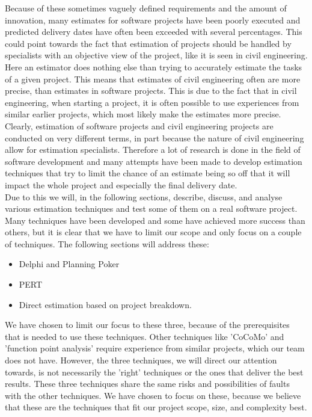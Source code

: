 Because of these sometimes vaguely defined requirements and the amount of innovation, many estimates for software projects have been poorly executed and predicted delivery dates have often been exceeded with several percentages. This could point towards the fact that estimation of projects should be handled by specialists with an objective view of the project, like it is seen in civil engineering. Here an estimator does nothing else than trying to accurately estimate the tasks of a given project\cite[p.140]{ProjectManagement_b}. This means that estimates of civil engineering often are more precise, than estimates in software projects. This is due to the fact that in civil engineering, when starting a project, it is often possible to use experiences from similar earlier projects, which most likely make the estimates more precise. \\
Clearly, estimation of software projects and civil engineering projects are conducted on very different terms, in part because the nature of civil engineering allow for estimation specialists. Therefore a lot of research is done in the field of software development and many attempts have been made to develop estimation techniques that try to limit the chance of an estimate being so off that it will impact the whole project and especially the final delivery date. \\
Due to this we will, in the following sections, describe, discuss, and analyse various estimation techniques and test some of them on a real software project. Many techniques have been developed and some have achieved more success than others, but it is clear that we have to limit our scope and only focus on a couple of techniques. The following sections will address these:

\begin{itemize}
\item Delphi and Planning Poker  
\item PERT 
\item Direct estimation based on project breakdown.
\end{itemize}


We have chosen to limit our focus to these three, because of the prerequisites that is needed to use these techniques. Other techniques like 'CoCoMo' and 'function point analysis' require experience from similar projects, which our team does not have. However, the three techniques, we will direct our attention towards, is not necessarily the 'right' techniques or the ones that deliver the best results. These three techniques share the same risks and possibilities of faults with the other techniques. We have chosen to focus on these, because we believe that these are the techniques that fit our project scope, size, and complexity best.
\\


